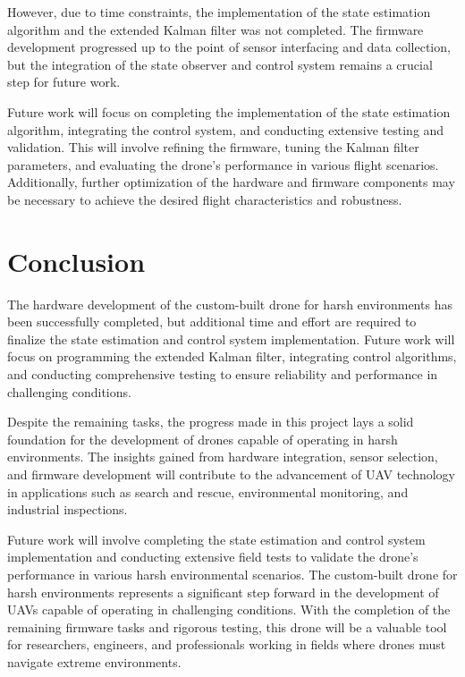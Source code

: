 \documentclass{article}
\begin{document}
However, due to time constraints, the implementation of the state estimation algorithm and the extended Kalman filter was not completed. The firmware development progressed up to the point of sensor interfacing and data collection, but the integration of the state observer and control system remains a crucial step for future work.

Future work will focus on completing the implementation of the state estimation algorithm, integrating the control system, and conducting extensive testing and validation. This will involve refining the firmware, tuning the Kalman filter parameters, and evaluating the drone's performance in various flight scenarios. Additionally, further optimization of the hardware and firmware components may be necessary to achieve the desired flight characteristics and robustness.

\section{Conclusion}

The hardware development of the custom-built drone for harsh environments has been successfully completed, but additional time and effort are required to finalize the state estimation and control system implementation. Future work will focus on programming the extended Kalman filter, integrating control algorithms, and conducting comprehensive testing to ensure reliability and performance in challenging conditions.

Despite the remaining tasks, the progress made in this project lays a solid foundation for the development of drones capable of operating in harsh environments. The insights gained from hardware integration, sensor selection, and firmware development will contribute to the advancement of UAV technology in applications such as search and rescue, environmental monitoring, and industrial inspections.

Future work will involve completing the state estimation and control system implementation and conducting extensive field tests to validate the drone's performance in various harsh environmental scenarios. The custom-built drone for harsh environments represents a significant step forward in the development of UAVs capable of operating in challenging conditions. With the completion of the remaining firmware tasks and rigorous testing, this drone will be a valuable tool for researchers, engineers, and professionals working in fields where drones must navigate extreme environments.
\end{document}

